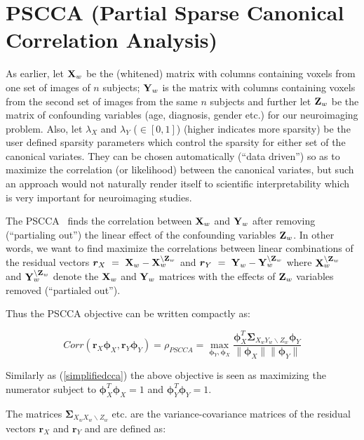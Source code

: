 \documentclass{llncs}
\newcommand{\X}{{\bf X}}
\newcommand{\Y}{{\bf Y}}
\newcommand{\Z}{{\bf Z}}
\newcommand{\bs}{\boldsymbol}
\begin{document}
\section{PSCCA (Partial Sparse Canonical Correlation Analysis)}
As earlier, let $\X_w$ be the (whitened) matrix with columns containing voxels from one set of
images of $n$ subjects; $\Y_w$ is the matrix with columns containing voxels from the second
set of images from the same $n$ subjects and further let $\Z_w$ be the matrix of confounding variables (age, diagnosis, gender etc.) for our neuroimaging problem. Also, let $\lambda_X$ and $\lambda_Y$ ($\in [0,1]$) (higher indicates more sparsity) be the user defined sparsity parameters which control the sparsity for either set of the canonical variates. They can be chosen automatically (``data driven'') so as to maximize the correlation (or likelihood) between the canonical variates, but such an approach would not naturally render itself  to scientific interpretability which is very important for neuroimaging studies. 

The PSCCA~\cite{timm} finds the correlation between $\X_w$ and $\Y_w$ after removing (``partialing out'') the linear effect of the confounding variables $\Z_w$. In other words, we want to find maximize the correlations between linear combinations of the residual vectors $\bs r_X~=~\X_w - \X_w^{\backslash\Z_w}$ and $\bs r_Y~=~\Y_w-\Y_w^{\backslash\Z_w}$ where $\X_w^{\backslash\Z_w}$ and $\Y_w^{\backslash\Z_w}$ denote the $\X_w$ and $\Y_w$ matrices with the effects of $\Z_w$ variables removed (``partialed out'').

Thus the PSCCA objective can be written compactly as:

\begin{equation}
\label{pscca}
Corr(\bs r_X \bs\phi_X,\bs r_Y \bs\phi_Y)=\rho_{PSCCA}=\max_{{\bs\phi_Y}, {\bs\phi_X}} \frac{\bs\phi_X^T \bs\Sigma_{X_wY_w\backslash Z_w}\bs\phi_Y}{\|\bs\phi_X\| \|\bs\phi_Y\|}
\end{equation}

Similarly as (\ref{simplifiedcca}) the above objective is seen as maximizing the numerator subject to  $\bs\phi_X^T\bs\phi_X=1$ and $\bs\phi_Y^T\bs\phi_Y=1$.

The matrices $\bs\Sigma_{X_wX_w\backslash Z_w}$ etc. are the variance-covariance matrices of the residual vectors $\bs r_X$ and $\bs r_Y$ and are defined as:
\end{document}
